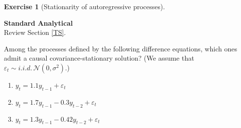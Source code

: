 \documentclass[
  11pt,
]{book}
\theoremstyle{definition}
\theoremstyle{definition}
\theoremstyle{definition}
\newtheorem{exercise}{Exercise}[chapter]
\theoremstyle{definition}
\theoremstyle{remark}
\begin{document}

\begin{exercisebox}

\begin{exercise}[Stationarity of autoregressive processes]
\protect\hypertarget{exr:time-series-stationarity}{}\label{exr:time-series-stationarity}

\textbf{Standard \textbar{} Analytical}\\
Review Section \ref{TS}.

Among the processes defined by the following difference equations, which ones admit a causal covariance-stationary solution? (We assume that \(\varepsilon_t \sim i.i.d.\,\mathcal{N}(0, \sigma^2)\).)

\begin{enumerate}
\def\labelenumi{\arabic{enumi}.}
\item
  \(y_t = 1.1 y_{t-1} + \varepsilon_t\)
\item
  \(y_t = 1.7 y_{t-1} - 0.3 y_{t-2} + \varepsilon_t\)
\item
  \(y_t = 1.3 y_{t-1} - 0.42 y_{t-2} + \varepsilon_t\)
\end{enumerate}

\end{exercise}

\end{exercisebox}

\end{document}
